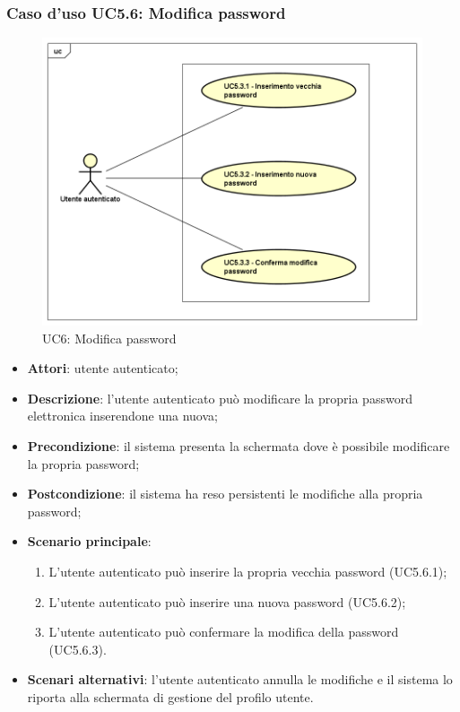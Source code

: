 \subsubsection{Caso d'uso UC5.6: Modifica password}
\label{UC5.6}
\begin{figure}[h]
	\centering
	\includegraphics[scale=0.5,keepaspectratio]{UML/UC5_6.png}
	\caption{UC6: Modifica password}
\end{figure}
\begin{itemize}
	\item \textbf{Attori}: utente autenticato;
	\item \textbf{Descrizione}: l'utente autenticato può modificare la propria password elettronica inserendone una nuova;
	\item \textbf{Precondizione}: il sistema presenta la schermata dove è possibile modificare la propria password;
	\item \textbf{Postcondizione}: il sistema ha reso persistenti le modifiche alla propria password;
	\item \textbf{Scenario principale}:
	\begin{enumerate}
		\item L'utente autenticato può inserire la propria vecchia password (UC5.6.1);
		\item L'utente autenticato può inserire una nuova password (UC5.6.2);
		\item L'utente autenticato può confermare la modifica della password (UC5.6.3).
	\end{enumerate}
	\item \textbf{Scenari alternativi}: l'utente autenticato annulla le modifiche e il sistema lo riporta alla schermata di gestione del profilo utente.
\end{itemize}

